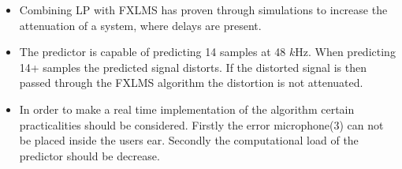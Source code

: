 \large
\begin{itemize}
\item Combining LP with FXLMS has proven through simulations to increase the attenuation of a system, where delays are present. \\
\item The predictor is capable of predicting 14 samples at 48 $k$Hz. When predicting 14+ samples the predicted signal distorts. If the distorted signal is then passed through the FXLMS algorithm the distortion is not attenuated.\\
\item In order to make a real time implementation of the algorithm certain practicalities should be considered. Firstly the error microphone(3) can not be placed inside the users ear. Secondly the computational load of the predictor should be decrease. %
\end{itemize}
